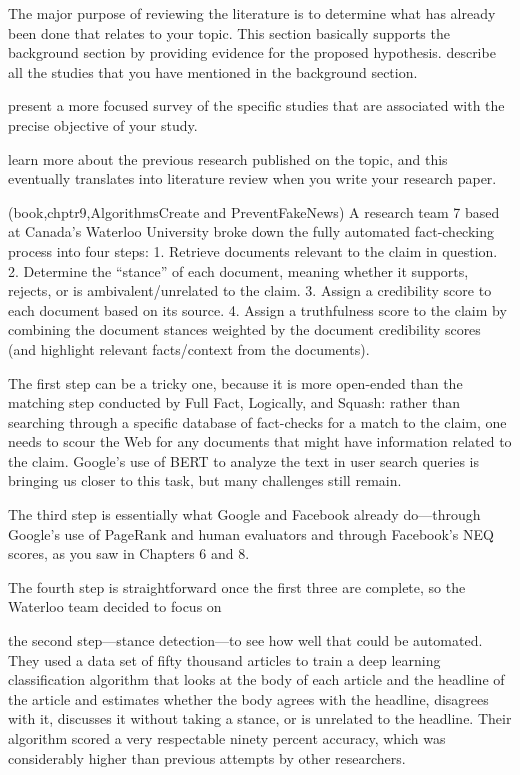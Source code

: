 The major purpose of reviewing the literature is to determine what has already been done that relates to your topic. 
This section basically supports the background section by providing evidence for the proposed hypothesis.
describe all the studies that you have mentioned in the background section. 

present a more focused survey of the specific studies that are associated with the precise objective of your study.

learn more about the previous research published on the topic, and this eventually translates into literature review when you write your research paper.


{\color{orange}(book,chptr9,AlgorithmsCreate and PreventFakeNews)}
A research team 7 based at Canada’s Waterloo University broke down the fully
automated fact-checking process into four steps:
1. Retrieve documents relevant to the claim in question.
2. Determine the “stance” of each document, meaning
whether it supports, rejects, or is ambivalent/unrelated
to the claim.
3. Assign a credibility score to each document based on its
source.
4. Assign a truthfulness score to the claim by combining the
document stances weighted by the document credibility
scores (and highlight relevant facts/context from the
documents).

The first step can be a tricky one, because it is more open-ended than the matching step conducted by Full Fact, Logically, and Squash: rather than searching through a specific database of fact-checks for a match to the claim, one needs to scour the Web for any documents that might have information related to the claim. Google’s use of BERT to analyze the text in user search queries is bringing us closer to this task, but many challenges still remain.

The third step is essentially what Google and Facebook already do—through Google’s use of PageRank and human evaluators and through Facebook’s NEQ scores, as you saw in Chapters 6 and 8. 

The fourth step is straightforward once the first three are complete, so the Waterloo team decided to focus on

the second step—stance detection—to see how well that could be automated. They used a data set of fifty thousand articles to train a deep learning classification algorithm that looks at the body of each article and the headline of the article and estimates whether the body agrees with the headline, disagrees with it, discusses it without taking a stance, or is unrelated to the headline. Their algorithm scored a very respectable ninety percent accuracy, which was considerably higher than previous attempts by other researchers. 


